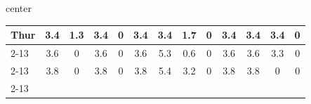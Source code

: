 \documentclass{article}
\begin{document}
\begin{adjustbox}{center}
\begin{tabular}{lcccccccccccc}
		\multicolumn{1}{l|}{{ Thur}}                                      & \multicolumn{1}{c|}{{ 3.4}}                                  & \multicolumn{1}{c|}{{ 1.3}}                                   & \multicolumn{1}{c|}{{ 3.4}}                                  & \multicolumn{1}{c|}{{ 0}}                                     & \multicolumn{1}{c|}{{ 3.4}}                                  & \multicolumn{1}{c|}{{ 3.4}}                                   & \multicolumn{1}{c|}{{ 1.7}}                                  & \multicolumn{1}{c|}{{ 0}}                                     & \multicolumn{1}{c|}{{ 3.4}}                                  & \multicolumn{1}{c|}{{ 3.4}}                                   & \multicolumn{1}{c|}{{ 3.4}}                                  & \multicolumn{1}{c|}{{ 0}}                                     \\ \cline{2-13} 
		\multicolumn{1}{l|}{{ Fri}}                                       & \multicolumn{1}{c|}{{ 3.6}}                                  & \multicolumn{1}{c|}{{ 0}}                                     & \multicolumn{1}{c|}{{ 3.6}}                                  & \multicolumn{1}{c|}{{ 0}}                                     & \multicolumn{1}{c|}{{ 3.6}}                                  & \multicolumn{1}{c|}{{ 5.3}}                                   & \multicolumn{1}{c|}{{ 0.6}}                                  & \multicolumn{1}{c|}{{ 0}}                                     & \multicolumn{1}{c|}{{ 3.6}}                                  & \multicolumn{1}{c|}{{ 3.6}}                                   & \multicolumn{1}{c|}{{ 3.3}}                                  & \multicolumn{1}{c|}{{ 0}}                                     \\ \cline{2-13} 
		\multicolumn{1}{l|}{{ Sat}}                                       & \multicolumn{1}{c|}{{ 3.8}}                                  & \multicolumn{1}{c|}{{ 0}}                                     & \multicolumn{1}{c|}{{ 3.8}}                                  & \multicolumn{1}{c|}{{ 0}}                                     & \multicolumn{1}{c|}{{ 3.8}}                                  & \multicolumn{1}{c|}{{ 5.4}}                                   & \multicolumn{1}{c|}{{ 3.2}}                                  & \multicolumn{1}{c|}{{ 0}}                                     & \multicolumn{1}{c|}{{ 3.8}}                                  & \multicolumn{1}{c|}{{ 3.8}}                                   & \multicolumn{1}{c|}{{ 0}}                                    & \multicolumn{1}{c|}{{ 0}}                                     \\ \cline{2-13} 

\end{tabular}
\end{adjustbox}
\end{document}
